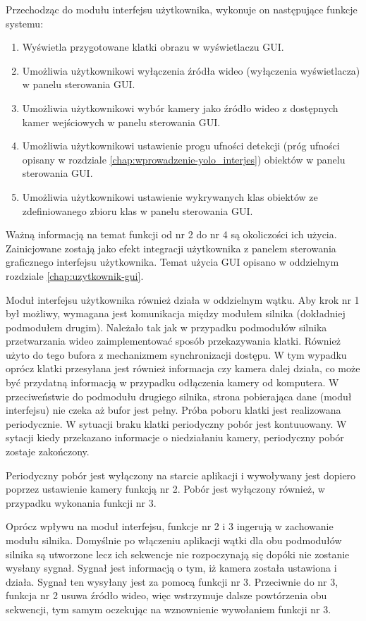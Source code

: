 Przechodząc do modułu interfejsu użytkownika, wykonuje on następujące funkcje systemu:
\begin{enumerate}
    \item Wyświetla przygotowane klatki obrazu w wyświetlaczu GUI.
    \item Umożliwia użytkownikowi wyłączenia źródła wideo (wyłączenia wyświetlacza) w panelu sterowania GUI.
    \item Umożliwia użytkownikowi wybór kamery jako źródło wideo z dostępnych kamer wejściowych w panelu sterowania GUI.
    \item Umożliwia użytkownikowi ustawienie progu ufności detekcji (próg ufności opisany w rozdziale \ref{chap:wprowadzenie-yolo_interjes}) obiektów w panelu sterowania GUI.
    \item Umożliwia użytkownikowi ustawienie wykrywanych klas obiektów ze zdefiniowanego zbioru klas w panelu sterowania GUI.
\end{enumerate}
Ważną informacją na temat funkcji od nr 2 do nr 4 są okoliczości ich użycia. Zainicjowane zostają jako efekt integracji użytkownika z panelem sterowania graficznego interfejsu użytkownika. Temat użycia GUI opisano w oddzielnym rozdziale \ref{chap:uzytkownik-gui}. 

Moduł interfejsu użytkownika również działa w oddzielnym wątku. Aby krok nr 1 był możliwy, wymagana jest komunikacja między modułem silnika (dokładniej podmodułem drugim).  
Należało tak jak w przypadku podmodułów silnika przetwarzania wideo zaimplementować sposób przekazywania klatki. Również użyto do tego bufora z mechanizmem synchronizacji dostępu. W tym wypadku oprócz klatki przesyłana jest również informacja czy kamera dalej działa, co może być przydatną informacją w przypadku odłączenia kamery od komputera. W przeciweństwie do podmodułu drugiego silnika, strona pobierająca dane (moduł interfejsu) nie czeka aż bufor jest pełny. Próba poboru klatki jest realizowana periodycznie. W sytuacji braku klatki periodyczny pobór jest kontuuowany. W sytacji kiedy przekazano informacje o niedziałaniu kamery, periodyczny pobór zostaje zakończony.

Periodyczny pobór jest wyłączony na starcie aplikacji i wywoływany jest dopiero poprzez ustawienie kamery funkcją nr 2. Pobór jest wyłączony również, w przypadku wykonania funkcji nr 3.

Oprócz wpływu na moduł interfejsu, funkcje nr 2 i 3 ingerują w zachowanie modułu silnika. Domyślnie po włączeniu aplikacji wątki dla obu podmodułów silnika są utworzone lecz ich sekwencje nie rozpoczynają się dopóki nie zostanie wysłany sygnał. Sygnał jest informacją o tym, iż kamera została ustawiona i działa. Sygnał ten wysyłany jest za pomocą funkcji nr 3. Przeciwnie do nr 3, funkcja nr 2 usuwa źródło wideo, więc wstrzymuje dalsze powtórzenia obu sekwencji, tym samym oczekując na wznownienie wywołaniem funkcji nr 3.

